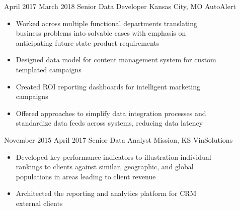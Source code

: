 \Experience
{April 2017}
{March 2018}
{Senior Data Developer}
{Kansas City, MO}
{AutoAlert}
{\begin{itemize}
      \item Worked across multiple functional departments translating
      \\ business problems into solvable cases with emphasis on
      \\ anticipating future state product requirements
      \item Designed data model for content management system for custom
      \\ templated campaigns
      \item Created ROI reporting dashboards for intelligent marketing
      \\ campaigns
      \item Offered approaches to simplify data integration processes and
      \\ standardize data feeds across systems, reducing data latency
\end{itemize}}

\vspace*{0.05 in}

\Experience
{November 2015}
{April 2017}
{Senior Data Analyst}
{Mission, KS}
{VinSolutions}
{\begin{itemize}
     \item Developed key performance indicators to illustration individual
     \\ rankings to clients against similar, geographic, and global
     \\ populations in areas leading to client revenue
     \item Architected the reporting and analytics platform for CRM
     \\ external clients
\end{itemize}}
